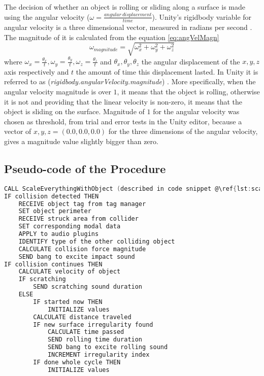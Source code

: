 The decision of whether an object is rolling or sliding along a surface is made using the angular velocity ($\omega = \frac{angular\ displacement}{time}$). Unity\textsuperscript{\textregistered}'s rigidbody variable for angular velocity is a three dimensional vector, measured in radians per second \cite{bib:unity_doc}. The magnitude of it is calculated from the equation \ref{eq:angVelMagn}
\begin{equation}\label{eq:angVelMagn}
\omega_{magnitude} = \sqrt{\omega_x^2+\omega_y^2+\omega_z^2}
\end{equation}
where $\omega_x = \frac{\theta_x}{t}, \omega_y = \frac{\theta_y}{t}, \omega_z = \frac{\theta_z}{t}$ and $\theta_x, \theta_y, \theta_z$ the angular displacement of the $x, y, z$ axis respectively and $t$ the amount of time this displacement lasted. In Unity\textsuperscript{\textregistered} it is referred to as (\textit{rigidbody.angularVelocity.magnitude}) \cite{bib:unity_doc}. More specifically, when the angular velocity magnitude is over $1$, it means that the object is rolling, otherwise it is not and providing that the linear velocity is non-zero, it means that the object is sliding on the surface. Magnitude of $1$ for the angular velocity was chosen as threshold, from trial and error tests in the Unity\textsuperscript{\textregistered} editor, because a vector of $x, y, z = (0.0, 0.0, 0.0)$ for the three dimensions of the angular velocity, gives a magnitude value slightly bigger than zero.



\subsection{Pseudo-code of the Procedure }

\begin{lstlisting}[caption={Code of the whole procedure},label={lst:all_code},language=C, escapechar=@]
CALL ScaleEverythingWithObject (described in code snippet @\ref{lst:scale}@)
IF collision detected THEN
	RECEIVE object tag from tag manager
	SET object perimeter
	RECEIVE struck area from collider
	SET corresponding modal data
	APPLY to audio plugins
	IDENTIFY type of the other colliding object
	CALCULATE collision force magnitude
	SEND bang to excite impact sound
IF collision continues THEN
	CALCULATE velocity of object
	IF scratching
		SEND scratching sound duration
	ELSE
		IF started now THEN
			INITIALIZE values
		CALCULATE distance traveled
		IF new surface irregularity found
			CALCULATE time passed
			SEND rolling time duration
			SEND bang to excite rolling sound
			INCREMENT irregularity index
		IF done whole cycle THEN
			INITIALIZE values	
\end{lstlisting}





